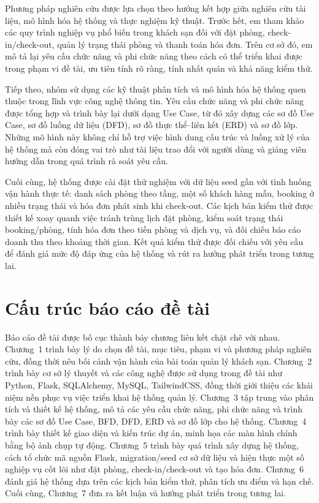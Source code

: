 \documentclass[13pt,a4paper]{extreport}
\begin{document}
Phương pháp nghiên cứu được lựa chọn theo hướng kết hợp giữa nghiên cứu tài liệu, mô hình hóa hệ thống và thực nghiệm kỹ thuật. Trước hết, em tham khảo các quy trình nghiệp vụ phổ biến trong khách sạn đối với đặt phòng, check-in/check-out, quản lý trạng thái phòng và thanh toán hóa đơn. Trên cơ sở đó, em mô tả lại yêu cầu chức năng và phi chức năng theo cách có thể triển khai được trong phạm vi đề tài, ưu tiên tính rõ ràng, tính nhất quán và khả năng kiểm thử.

Tiếp theo, nhóm sử dụng các kỹ thuật phân tích và mô hình hóa hệ thống quen thuộc trong lĩnh vực công nghệ thông tin. Yêu cầu chức năng và phi chức năng được tổng hợp và trình bày lại dưới dạng Use Case, từ đó xây dựng các sơ đồ Use Case, sơ đồ luồng dữ liệu (DFD), sơ đồ thực thể--liên kết (ERD) và sơ đồ lớp. Những mô hình này không chỉ hỗ trợ việc hình dung cấu trúc và luồng xử lý của hệ thống mà còn đóng vai trò như tài liệu trao đổi với người dùng và giảng viên hướng dẫn trong quá trình rà soát yêu cầu.

Cuối cùng, hệ thống được cài đặt thử nghiệm với dữ liệu seed gần với tình huống vận hành thực tế: danh sách phòng theo tầng, một số khách hàng mẫu, booking ở nhiều trạng thái và hóa đơn phát sinh khi check-out. Các kịch bản kiểm thử được thiết kế xoay quanh việc tránh trùng lịch đặt phòng, kiểm soát trạng thái booking/phòng, tính hóa đơn theo tiền phòng và dịch vụ, và đối chiếu báo cáo doanh thu theo khoảng thời gian. Kết quả kiểm thử được đối chiếu với yêu cầu để đánh giá mức độ đáp ứng của hệ thống và rút ra hướng phát triển trong tương lai.

\section{Cấu trúc báo cáo đề tài}

Báo cáo đề tài được bố cục thành bảy chương liên kết chặt chẽ với nhau. Chương~1 trình bày lý do chọn đề tài, mục tiêu, phạm vi và phương pháp nghiên cứu, đồng thời nêu bối cảnh vận hành của bài toán quản lý khách sạn. Chương~2 trình bày cơ sở lý thuyết và các công nghệ được sử dụng trong đề tài như Python, Flask, SQLAlchemy, MySQL, TailwindCSS, đồng thời giới thiệu các khái niệm nền phục vụ việc triển khai hệ thống quản lý. Chương~3 tập trung vào phân tích và thiết kế hệ thống, mô tả các yêu cầu chức năng, phi chức năng và trình bày các sơ đồ Use Case, BFD, DFD, ERD và sơ đồ lớp cho hệ thống. Chương~4 trình bày thiết kế giao diện và kiến trúc dự án, minh họa các màn hình chính bằng bộ ảnh chụp tự động. Chương~5 trình bày quá trình xây dựng hệ thống, cách tổ chức mã nguồn Flask, migration/seed cơ sở dữ liệu và hiện thực một số nghiệp vụ cốt lõi như đặt phòng, check-in/check-out và tạo hóa đơn. Chương~6 đánh giá hệ thống dựa trên các kịch bản kiểm thử, phân tích ưu điểm và hạn chế. Cuối cùng, Chương~7 đưa ra kết luận và hướng phát triển trong tương lai.
\end{document}
